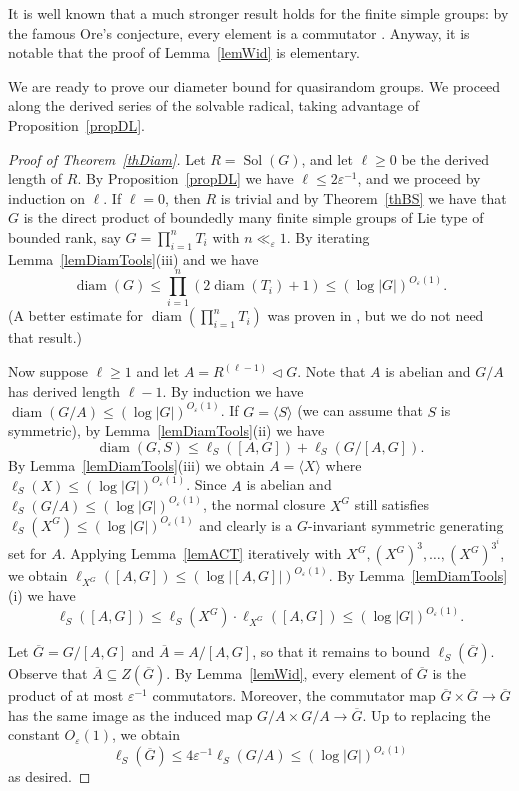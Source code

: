 \documentclass[11pt,reqno]{amsart}
\numberwithin{equation}{section}
\theoremstyle{definition}
\theoremstyle{remark}
\newcommand{\Sol}{\mathop{\mathrm{Sol}}}
\newcommand{\diam}{\mathop{\mathrm{diam}}}
\begin{document}
It is well known that a much stronger result holds for the finite simple groups:
by the famous Ore's conjecture, every element is a commutator \cite{LOST10}.
Anyway, it is notable that the proof of Lemma~\ref{lemWid} is elementary.

We are ready to prove our diameter bound for quasirandom groups.
We proceed along the derived series of the solvable radical,
taking advantage of Proposition~\ref{propDL}.

\begin{proof}[Proof of Theorem~\ref{thDiam}] 
Let $R=\Sol(G)$, and let $\ell \geq 0$ be the derived length of $R$.
By Proposition~\ref{propDL} we have $\ell \leq 2 \varepsilon^{-1}$, and we proceed by induction on $\ell$.
If $\ell=0$, then $R$ is trivial and by Theorem~\ref{thBS} we have that
$G$ is the direct product of boundedly many finite simple groups of Lie type of bounded rank,
say $G= \prod_{i=1}^n T_i$ with $n \ll_\varepsilon 1$.
By iterating Lemma~\ref{lemDiamTools}(iii) and \cite{BGT11,PS16} we have
$$ \diam(G) \leq \prod_{i=1}^n (2 \diam(T_i) +1) \leq (\log|G|)^{O_\varepsilon(1)} . $$
(A better estimate for $\diam(\prod_{i=1}^n T_i)$ was proven in \cite{Don22},
but we do not need that result.)

Now suppose $\ell \geq 1$ and let $A = R^{(\ell-1)} \lhd G$.
Note that $A$ is abelian and $G/A$ has derived length $\ell -1$.
By induction we have $\diam(G/A) \leq (\log|G|)^{O_\varepsilon(1)}$.
If $G = \langle S \rangle$ (we can assume that $S$ is symmetric),
by Lemma~\ref{lemDiamTools}(ii) we have
$$ \diam(G,S) \leq \ell_S([A,G]) + \ell_S(G/[A,G]) . $$
By Lemma~\ref{lemDiamTools}(iii)
we obtain $A=\langle X \rangle$ where $\ell_S(X) \leq (\log|G|)^{O_\varepsilon(1)}$.
Since $A$ is abelian and $\ell_S(G/A) \leq (\log|G|)^{O_\varepsilon(1)}$,
the normal closure $X^G$ still satisfies $\ell_S(X^G) \leq (\log|G|)^{O_\varepsilon(1)}$
and clearly is a $G$-invariant symmetric generating set for $A$.
Applying Lemma~\ref{lemACT} iteratively with $X^G,(X^G)^3,\ldots,(X^G)^{3^i}$,
we obtain $\ell_{X^G}([A,G]) \leq (\log|[A,G]|)^{O_\varepsilon(1)}$.
By Lemma~\ref{lemDiamTools}(i) we have
$$ \ell_S([A,G]) \leq \ell_S(X^G) \cdot \ell_{X^G}([A,G]) \leq (\log|G|)^{O_\varepsilon(1)} . $$

Let $\overline{G}=G/[A,G]$ and $\overline{A}=A/[A,G]$, so that it remains to bound $\ell_S(\overline{G})$.
Observe that $\overline{A} \subseteq Z(\overline{G})$.
By Lemma~\ref{lemWid}, every element of $\overline{G}$ is the product of at most $\varepsilon^{-1}$ commutators.
Moreover, the commutator map $\overline{G} \times \overline{G} \to \overline{G}$ has the same image as the
induced map $G/A \times G/A \to \overline{G}$.
Up to replacing the constant $O_\varepsilon(1)$, we obtain
$$ \ell_S(\overline{G}) \leq 4 \varepsilon^{-1} \ell_S(G/A) \leq (\log|G|)^{O_\varepsilon(1)} $$
as desired.
\end{proof} 
\end{document}
